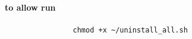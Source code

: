 \paragraph{to allow run}
    \begin{verbatim}
                chmod +x ~/uninstall_all.sh
    \end{verbatim}